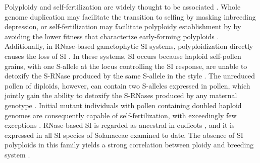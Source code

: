 Polyploidy and self-fertilization are widely thought to be associated \citep{stebbins1950}.
Whole genome duplication may facilitate the transition to selfing by masking inbreeding depression, or self-fertilization may facilitate polyploidy establishment by by avoiding the lower fitness that characterize early-forming polyploids \citep{levin_1975,ramsey_1998, barringer2007, barrett2008, husband2008}.%
Additionally, in RNase-based gametophytic SI systems, polyploidization directly causes the loss of SI \citep{stout1942, lewis1947}.
In these systems, SI occurs because haploid self-pollen grains, with one S-allele at the locus controlling the SI response, are unable to detoxify the S-RNase produced by the same S-allele in the style \citep{kubo2010}.
The unreduced pollen of diploids, however, can contain two S-alleles expressed in pollen, which jointly gain the ability to detoxify the S-RNases produced by any maternal genotype \citep{entani1999, tsukamoto2005, kubo2010}.
Initial mutant individuals with pollen containing doubled haploid genomes are consequently capable of self-fertilization, with exceedingly few exceptions \citep{hauck_2002, nunes_2006}.
RNase-based SI is regarded as ancestral in eudicots \citep{igic_2001,steinbachs_2002}, and it is expressed in all SI species of Solanaceae examined to date.
The absence of SI polyploids in this family yields a strong correlation between ploidy and breeding system \citep{robertson_2011}.


